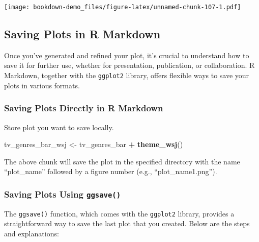 \documentclass[
  b5paper]{book}
\newenvironment{Shaded}{\begin{snugshade}}{\end{snugshade}}
\newcommand{\FunctionTok}[1]{\textcolor[rgb]{0.13,0.29,0.53}{\textbf{#1}}}
\newcommand{\NormalTok}[1]{#1}
\newcommand{\OtherTok}[1]{\textcolor[rgb]{0.56,0.35,0.01}{#1}}
\newcommand{\SpecialCharTok}[1]{\textcolor[rgb]{0.81,0.36,0.00}{\textbf{#1}}}
\begin{document}
\texttt{[image: bookdown-demo\_files/figure-latex/unnamed-chunk-107-1.pdf]}

\hypertarget{saving-plots-in-r-markdown}{%
\subsection*{Saving Plots in R Markdown}\label{saving-plots-in-r-markdown}}

Once you've generated and refined your plot, it's crucial to understand how to save it for further use, whether for presentation, publication, or collaboration. R Markdown, together with the \texttt{ggplot2} library, offers flexible ways to save your plots in various formats.

\hypertarget{saving-plots-directly-in-r-markdown}{%
\subsubsection*{Saving Plots Directly in R Markdown}\label{saving-plots-directly-in-r-markdown}}

Store plot you want to save locally.

\begin{Shaded}
\begin{Highlighting}[]
\NormalTok{tv\_genres\_bar\_wsj }\OtherTok{\textless{}{-}}\NormalTok{ tv\_genres\_bar }\SpecialCharTok{+}
  \FunctionTok{theme\_wsj}\NormalTok{()}
\end{Highlighting}
\end{Shaded}

The above chunk will save the plot in the specified directory with the name ``plot\_name'' followed by a figure number (e.g., ``plot\_name1.png'').

\hypertarget{saving-plots-using-ggsave}{%
\subsubsection*{\texorpdfstring{Saving Plots Using \texttt{ggsave()}}{Saving Plots Using ggsave()}}\label{saving-plots-using-ggsave}}

The \texttt{ggsave()} function, which comes with the \texttt{ggplot2} library, provides a straightforward way to save the last plot that you created. Below are the steps and explanations:
\end{document}
